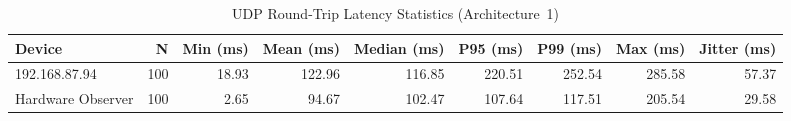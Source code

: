 \begin{table}[h]
\centering
\caption{UDP Round-Trip Latency Statistics (Architecture~1)}
\label{tab:arch1_latency}
\begin{tabular}{lrrrrrrrr}
\toprule
Device & N & Min (ms) & Mean (ms) & Median (ms) & P95 (ms) & P99 (ms) & Max (ms) & Jitter (ms) \\
\midrule
192.168.87.94 & 100 & 18.93 & 122.96 & 116.85 & 220.51 & 252.54 & 285.58 & 57.37 \\
Hardware Observer & 100 & 2.65 & 94.67 & 102.47 & 107.64 & 117.51 & 205.54 & 29.58 \\
\bottomrule
\end{tabular}
\end{table}
